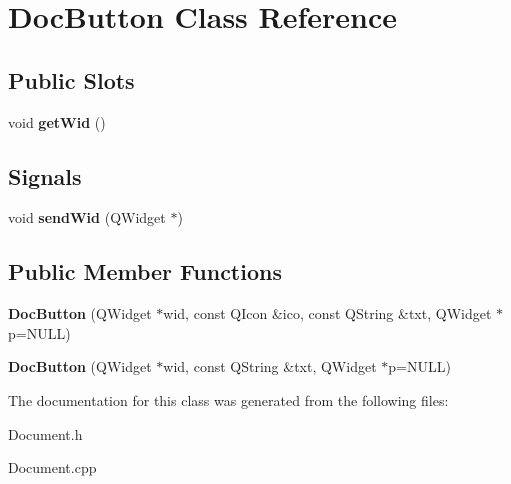 \hypertarget{classDocButton}{\section{\-Doc\-Button \-Class \-Reference}
\label{classDocButton}
}
\subsection*{\-Public \-Slots}
\begin{DoxyCompactItemize}
\item 
\hypertarget{classDocButton_a5d63f4e51ca56ab7baf5889e48e15a18}{void {\bfseries get\-Wid} ()}\label{classDocButton_a5d63f4e51ca56ab7baf5889e48e15a18}

\end{DoxyCompactItemize}
\subsection*{\-Signals}
\begin{DoxyCompactItemize}
\item 
\hypertarget{classDocButton_abcd0d83f0fa7b5fa65a77bad45440641}{void {\bfseries send\-Wid} (\-Q\-Widget $\ast$)}\label{classDocButton_abcd0d83f0fa7b5fa65a77bad45440641}

\end{DoxyCompactItemize}
\subsection*{\-Public \-Member \-Functions}
\begin{DoxyCompactItemize}
\item 
\hypertarget{classDocButton_abbf6712177714850a283ab7ac9699232}{{\bfseries \-Doc\-Button} (\-Q\-Widget $\ast$wid, const \-Q\-Icon \&ico, const \-Q\-String \&txt, \-Q\-Widget $\ast$p=\-N\-U\-L\-L)}\label{classDocButton_abbf6712177714850a283ab7ac9699232}

\item 
\hypertarget{classDocButton_a6a3dba7215d7ccd3d0d845d6caaa74bf}{{\bfseries \-Doc\-Button} (\-Q\-Widget $\ast$wid, const \-Q\-String \&txt, \-Q\-Widget $\ast$p=\-N\-U\-L\-L)}\label{classDocButton_a6a3dba7215d7ccd3d0d845d6caaa74bf}

\end{DoxyCompactItemize}


\-The documentation for this class was generated from the following files\-:\begin{DoxyCompactItemize}
\item 
\-Document.\-h\item 
\-Document.\-cpp\end{DoxyCompactItemize}
